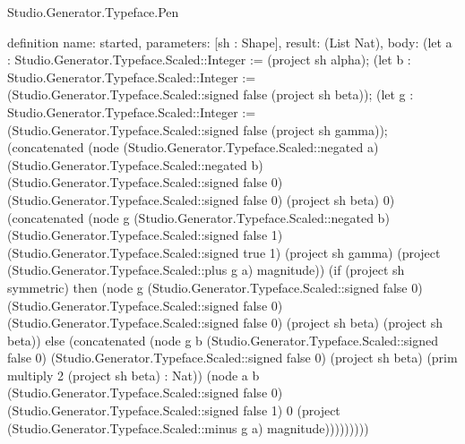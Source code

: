 \begin{lexlean}{Studio.Generator.Typeface.Pen}
\begin{semanticmodule}
definition{
  name: started,
  parameters: [sh : Shape],
  result: (List Nat),
  body: (let a : Studio.Generator.Typeface.Scaled::Integer := (project sh alpha); (let b : Studio.Generator.Typeface.Scaled::Integer := (Studio.Generator.Typeface.Scaled::signed false (project sh beta)); (let g : Studio.Generator.Typeface.Scaled::Integer := (Studio.Generator.Typeface.Scaled::signed false (project sh gamma)); (concatenated (node (Studio.Generator.Typeface.Scaled::negated a) (Studio.Generator.Typeface.Scaled::negated b) (Studio.Generator.Typeface.Scaled::signed false 0) (Studio.Generator.Typeface.Scaled::signed false 0) (project sh beta) 0) (concatenated (node g (Studio.Generator.Typeface.Scaled::negated b) (Studio.Generator.Typeface.Scaled::signed false 1) (Studio.Generator.Typeface.Scaled::signed true 1) (project sh gamma) (project (Studio.Generator.Typeface.Scaled::plus g a) magnitude)) (if (project sh symmetric) then (node g (Studio.Generator.Typeface.Scaled::signed false 0) (Studio.Generator.Typeface.Scaled::signed false 0) (Studio.Generator.Typeface.Scaled::signed false 0) (project sh beta) (project sh beta)) else (concatenated (node g b (Studio.Generator.Typeface.Scaled::signed false 0) (Studio.Generator.Typeface.Scaled::signed false 0) (project sh beta) (prim multiply 2 (project sh beta) : Nat)) (node a b (Studio.Generator.Typeface.Scaled::signed false 0) (Studio.Generator.Typeface.Scaled::signed false 1) 0 (project (Studio.Generator.Typeface.Scaled::minus g a) magnitude)))))))))
}


\end{semanticmodule}
\end{lexlean}
